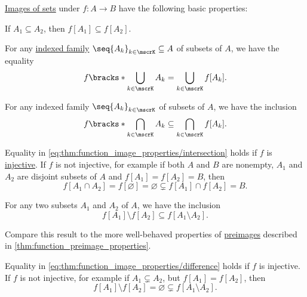 \begin{proposition}\label{thm:function_image_properties}
  \hyperref[def:set_valued_map/image]{Images of sets} under \( f: A \to B \) have the following basic properties:
  \begin{thmenum}
     If \( A_1 \subseteq A_2 \), then \( f[A_1] \subseteq f[A_2] \).

     For any \hyperref[def:indexed_family]{indexed family} \( \seq{ A_k }_{k \in \mscrK} \subseteq A \) of subsets of \( A \), we have the equality
    \begin{equation}\label{eq:thm:function_image_properties/union}
      f\bracks*{ \bigcup_{k \in \mscrK} A_k } = \bigcup_{k \in \mscrK} f[A_k].
    \end{equation}

     For any indexed family \( \seq{ A_k }_{k \in \mscrK} \) of subsets of \( A \), we have the inclusion
    \begin{equation}\label{eq:thm:function_image_properties/intersection}
      f\bracks*{ \bigcap_{k \in \mscrK} A_k } \subseteq \bigcap_{k \in \mscrK} f[A_k].
    \end{equation}

    Equality in \eqref{eq:thm:function_image_properties/intersection} holds if \( f \) is \hyperref[def:function_invertibility/injective]{injective}. If \( f \) is not injective, for example if both \( A \) and \( B \) are nonempty, \( A_1 \) and \( A_2 \) are disjoint subsets of \( A \) and \( f[A_1] = f[A_2] = B \), then
    \begin{equation*}
      f[A_1 \cap A_2] = f[\varnothing] = \varnothing \subsetneq f[A_1] \cap f[A_2] = B.
    \end{equation*}

     For any two subsets \( A_1 \) and \( A_2 \) of \( A \), we have the inclusion
    \begin{equation}\label{eq:thm:function_image_properties/difference}
      f[A_1] \setminus f[A_2] \subseteq f[A_1 \setminus A_2].
    \end{equation}
  \end{thmenum}
\end{proposition}
\begin{comments}
  \item Compare this result to the more well-behaved properties of \hyperref[def:set_valued_map/inverse]{preimages} described in \cref{thm:function_preimage_properties}.

  \item Equality in \eqref{eq:thm:function_image_properties/difference} holds if \( f \) is injective. If \( f \) is not injective, for example if \( A_1 \subsetneq A_2 \), but \( f[A_1] = f[A_2] \), then
  \begin{equation*}
    f[A_1] \setminus f[A_2] = \varnothing \subsetneq f[A_1 \setminus A_2].
  \end{equation*}
\end{comments}
